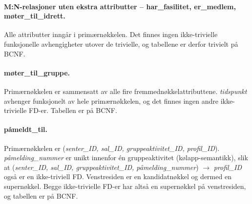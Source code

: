 \paragraph{M:N-relasjoner uten ekstra attributter – har\_fasilitet, er\_medlem, møter\_til\_idrett.}
Alle attributter inngår i primærnøkkelen. Det finnes ingen ikke-trivielle funksjonelle avhengigheter
utover de trivielle, og tabellene er derfor trivielt på BCNF.

\paragraph{møter\_til\_gruppe.}
Primærnøkkelen er sammensatt av alle fire fremmednøkkelattributtene.
\textit{tidspunkt} avhenger funksjonelt av hele primærnøkkelen, og det finnes
ingen andre ikke-trivielle FD-er. Tabellen er på BCNF.

\paragraph{påmeldt\_til.}
Primærnøkkelen er (\textit{senter\_ID, sal\_ID, gruppeaktivitet\_ID, profil\_ID}).
\textit{påmelding\_nummer} er unikt innenfor én gruppeaktivitet (kølapp-semantikk),
slik at (\textit{senter\_ID, sal\_ID, gruppeaktivitet\_ID, påmelding\_nummer}) $\rightarrow$ \textit{profil\_ID}
også er en ikke-triviell FD. Venstresiden er en kandidatnøkkel og dermed en supernøkkel.
Begge ikke-trivielle FD-er har altså en supernøkkel på venstresiden, og tabellen er på BCNF.
